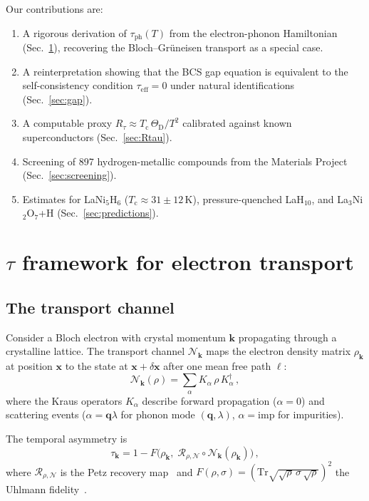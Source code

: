 \documentclass[prb,twocolumn,superscriptaddress,longbibliography,floatfix]{revtex4-2}
\newcommand{\Tr}{\mathrm{Tr}}
\newcommand{\Petz}{\mathcal{R}}
\newcommand{\chan}{\mathcal{N}}
\newcommand{\tauasym}{\tau}
\newcommand{\taueff}{\tauasym_{\mathrm{eff}}}
\newcommand{\taudec}{\tauasym_{\mathrm{ph}}}
\newcommand{\Rtau}{R_{\tauasym}}
\newcommand{\Tc}{T_{\mathrm{c}}}
\newcommand{\ThetaD}{\Theta_{\mathrm{D}}}
\begin{document}
Our contributions are:
\begin{enumerate}
\item A rigorous derivation of $\taudec(T)$ from the
  electron-phonon Hamiltonian (Sec.~\ref{sec:tau_transport}),
  recovering the Bloch--Gr\"uneisen transport as a special case.
\item A reinterpretation showing that the BCS gap equation
  is equivalent to the self-consistency condition $\taueff = 0$
  under natural identifications (Sec.~\ref{sec:gap}).
\item A computable proxy $\Rtau \approx \Tc\, \ThetaD / T^2$
  calibrated against known superconductors (Sec.~\ref{sec:Rtau}).
\item Screening of 897 hydrogen-metallic compounds from the
  Materials Project~\cite{Jain2013} (Sec.~\ref{sec:screening}).
\item Estimates for LaNi$_5$H$_6$ ($\Tc \approx 31 \pm 12\,$K),
  pressure-quenched LaH$_{10}$, and La$_3$Ni$_2$O$_7$+H
  (Sec.~\ref{sec:predictions}).
\end{enumerate}

\section{$\tauasym$ framework for electron transport}
\label{sec:tau_transport}

\subsection{The transport channel}

Consider a Bloch electron with crystal momentum $\bm{k}$ propagating
through a crystalline lattice.  The transport channel $\chan_{\bm{k}}$
maps the electron density matrix $\rho_{\bm{k}}$ at position
$\bm{x}$ to the state at $\bm{x} + \delta\bm{x}$ after one
mean free path $\ell$:
\begin{equation}\label{eq:channel}
  \chan_{\bm{k}}(\rho) = \sum_{\alpha} K_\alpha\, \rho\, K_\alpha^\dagger\,,
\end{equation}
where the Kraus operators $K_\alpha$ describe forward propagation
($\alpha = 0$) and scattering events ($\alpha = \bm{q}\lambda$
for phonon mode $(\bm{q},\lambda)$, $\alpha = \mathrm{imp}$
for impurities).

The temporal asymmetry is
\begin{equation}\label{eq:tau_def}
  \tauasym_{\bm{k}} = 1 - F\!\bigl(\rho_{\bm{k}},\;
  \Petz_{\rho,\chan} \circ \chan_{\bm{k}}(\rho_{\bm{k}})\bigr)\,,
\end{equation}
where $\Petz_{\rho,\chan}$ is the Petz recovery
map~\cite{Petz1988} and $F(\rho,\sigma) =
(\Tr\sqrt{\sqrt{\rho}\,\sigma\,\sqrt{\rho}})^2$ the Uhlmann
fidelity~\cite{Uhlmann1976}.
\end{document}
